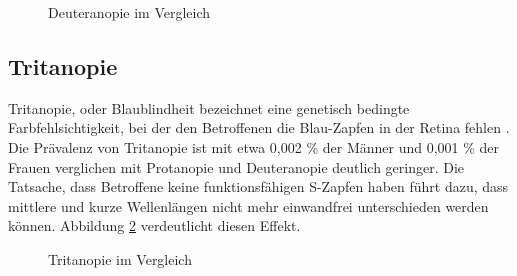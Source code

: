\documentclass[a4paper]{article}
\begin{document}
\begin{figure}[H]
\centering
{}
\caption{Deuteranopie im Vergleich}
\label{deuteranope}
\end{figure}

\newpage

\subsection*{Tritanopie}
Tritanopie, oder Blaublindheit bezeichnet eine genetisch bedingte Farbfehlsichtigkeit, bei der den Betroffenen die Blau-Zapfen in der Retina fehlen \cite{WP-T}. Die Prävalenz von Tritanopie ist mit etwa 0,002 \% der Männer und 0,001 \% der Frauen verglichen mit Protanopie und Deuteranopie deutlich geringer. Die Tatsache, dass Betroffene keine funktionsfähigen S-Zapfen haben führt dazu, dass mittlere und kurze Wellenlängen nicht mehr einwandfrei unterschieden werden können. Abbildung \ref{tritanope} verdeutlicht diesen Effekt.

\begin{figure}[H]
\centering
{}
\caption{Tritanopie im Vergleich}
\label{tritanope}
\end{figure}
\end{document}
